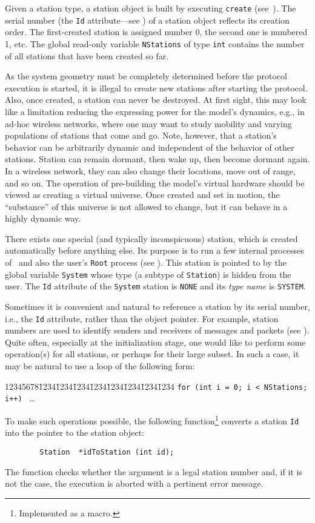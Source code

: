 Given a station type, a station object is built by executing {\tt create}
(see~).
The serial number (the {\tt Id} attribute---see ) of a
station object reflects its creation order.
The first-created station is assigned number 0, the second one is numbered 1,
etc.
The global read-only variable {\tt NStations} of type {\tt int} contains
the number of all stations that have been created so far.

As the system geometry must be completely determined before the protocol
execution is started, it is illegal to create new stations after starting
the protocol.
Also, once created, a station can never be destroyed.
At first sight, this may look like a limitation reducing the expressing power
for the model's dynamics, e.g., in ad-hoc wireless networks, where one may
want to study mobility and varying populations of stations that come and go.
Note, however, that a station's behavior can be arbitrarily dynamic and
independent of the behavior of other stations.
Station can remain dormant, then wake up, then become dormant again.
In a wireless network, they can also change their locations, move out of range,
and so on.
The operation of pre-building the model's virtual hardware should be viewed as
creating a virtual universe.
Once created and set in motion, the ``substance'' of this universe is not
allowed to change, but it can behave in a highly dynamic way.

There exists one special (and typically inconspicuous) station,
which is created automatically before anything else.
Its purpose is to run a few internal processes
of \smurph\ and also the user's {\tt Root} process (see ).
This station is pointed to by the global variable {\tt System} whose
type (a subtype of {\tt Station}) is hidden from the user.
The {\tt Id} attribute of the {\tt System} station is {\tt NONE} and its
{\em type name\/} is {\tt SYSTEM}.

Sometimes it is convenient and natural to reference a station by its
serial number, i.e., the {\tt Id} attribute, rather than the object pointer.
For example, station numbers are used to identify senders and receivers
of messages and packets (see ).
Quite often, especially at the initialization stage, one would like to perform
some operation(s) for all stations, or perhaps for their large subset.
In such a case, it may be natural to use a loop of the following form:
{\tt\begin{tabbing}
12345678\=1234\=1234\=1234\=1234\=1234\=1234\=1234\=1234\kill
 \> {\tt for (int i = 0; i < NStations; i++) } \ldots
\end{tabbing}}
To make such operations possible,
the following function\footnote{Implemented as a macro.} converts a
station {\tt Id} into the pointer to the station object:
\begin{verbatim}
        Station  *idToStation (int id);
\end{verbatim}
The function checks whether the argument is a legal station number and, if it
is not the case, the execution is aborted with a pertinent error message.

